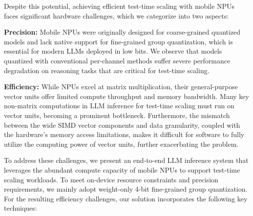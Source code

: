 Despite this potential, achieving efficient test-time scaling with mobile NPUs faces significant hardware challenges, which we categorize into two aspects:

\textbf{Precision:} Mobile NPUs were originally designed for coarse-grained quantized models and lack native support for fine-grained group quantization, which is essential for modern LLMs deployed in low bits. We observe that models quantized with conventional per-channel methods suffer severe performance degradation on reasoning tasks that are critical for test-time scaling.

\textbf{Efficiency:} While NPUs excel at matrix multiplication, their general-purpose vector units offer limited compute throughput and memory bandwidth. Many key non-matrix computations in LLM inference for test-time scaling must run on vector units, becoming a prominent bottleneck. Furthermore, the mismatch between the wide SIMD vector components and data granularity, coupled with the hardware's memory access limitations, makes it difficult for software to fully utilize the computing power of vector units, further exacerbating the problem. 

To address these challenges, we present an end-to-end LLM inference system that leverages the abundant compute capacity of mobile NPUs to support test-time scaling workloads. To meet on-device resource constraints and precision requirements, we mainly adopt weight-only 4-bit fine-grained group quantization. For the resulting efficiency challenges, our solution incorporates the following key techniques:



